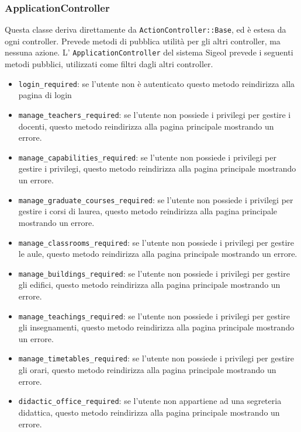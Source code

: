 \documentclass[11pt,a4paper]{article}
\begin{document}
\subsubsection{ApplicationController}
Questa classe deriva direttamente da \verb|ActionController::Base|, ed è estesa da ogni controller. Prevede metodi di pubblica utilità per gli altri controller, ma nessuna azione. L' \verb|ApplicationController| del sistema Sigeol prevede i seguenti metodi pubblici, utilizzati come filtri dagli altri controller.
\begin{itemize}
 \item \verb|login_required|: se l'utente non è autenticato questo metodo reindirizza alla pagina di login
 \item \verb|manage_teachers_required|: se l'utente non possiede i privilegi per gestire i docenti, questo metodo reindirizza alla pagina principale mostrando un errore.
 \item \verb|manage_capabilities_required|: se l'utente non possiede i privilegi per gestire i privilegi, questo metodo reindirizza alla pagina principale mostrando un errore.
 \item \verb|manage_graduate_courses_required|: se l'utente non possiede i privilegi per gestire i corsi di laurea, questo metodo reindirizza alla pagina principale mostrando un errore.
 \item \verb|manage_classrooms_required|: se l'utente non possiede i privilegi per gestire le aule, questo metodo reindirizza alla pagina principale mostrando un errore.
 \item \verb|manage_buildings_required|: se l'utente non possiede i privilegi per gestire gli edifici, questo metodo reindirizza alla pagina principale mostrando un errore.
 \item \verb|manage_teachings_required|: se l'utente non possiede i privilegi per gestire gli insegnamenti, questo metodo reindirizza alla pagina principale mostrando un errore.
 \item \verb|manage_timetables_required|: se l'utente non possiede i privilegi per gestire gli orari, questo metodo reindirizza alla pagina principale mostrando un errore.
 \item \verb|didactic_office_required|: se l'utente non appartiene ad una segreteria didattica, questo metodo reindirizza alla pagina principale mostrando un errore.
\end{itemize}
\end{document}
